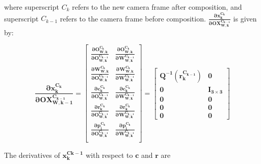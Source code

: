 \noindent where superscript $C_k$ refers to the new camera frame after
composition, and superscript $C_{k-1}$ refers to the camera frame
before composition.
$\boldsymbol{\frac{\partial x_k^{C_k}}{\partial OX_{W,k}^{C_{k-1}}}}$ is
given by:

\begin{equation}
\boldsymbol{\frac{\partial x_{k}^{C_k}}{\partial OX_{W,k-1}^{C_{k-1}}}}=
\begin{bmatrix}
\boldsymbol{\frac{\partial O_{W,k}^{C_k}}{\partial O_{W,k}^{C_{k-1}}}} & 
\boldsymbol{\frac{\partial O_{W,k}^{C_k}}{\partial W_{W,k}^{C_{k-1}}}} \\
\boldsymbol{\frac{\partial W_{W,k}^{C_k}}{\partial O_{W,k}^{C_{k-1}}}} & 
\boldsymbol{\frac{\partial W_{W,k}^{C_k}}{\partial W_{W,k}^{C_{k-1}}}} \\
\boldsymbol{\frac{\partial c_{k}^{C_k}}{\partial O_{W,k}^{C_{k-1}}}} &
\boldsymbol{\frac{\partial c_{k}^{C_k}}{\partial W_{W,k}^{C_{k-1}}}} \\
\boldsymbol{\frac{\partial r_{k}^{C_k}}{\partial O_{W,k}^{C_{k-1}}}} &
\boldsymbol{\frac{\partial r_{k}^{C_k}}{\partial W_{W,k}^{C_{k-1}}}} \\
\boldsymbol{\frac{\partial p_{i}^{C_k}}{\partial O_{W,k}^{C_{k-1}}}} & 
\boldsymbol{\frac{\partial p_{i}^{C_k}}{\partial W_{W,k}^{C_{k-1}}}} \\
\end{bmatrix}= \begin{bmatrix}
\boldsymbol{Q^{-1}(r_k^{C_{k-1}})} & \boldsymbol{0} \\
\boldsymbol{0} & \boldsymbol{I_{3\times 3}} \\
\boldsymbol{0} & \boldsymbol{0} \\
\boldsymbol{0} & \boldsymbol{0} \\
\boldsymbol{0} & \boldsymbol{0} 
\end{bmatrix}
\end{equation}


The derivatives of $\boldsymbol{x_{k}^{C{k-1}}}$ with respect to $\boldsymbol{c}$
and $\boldsymbol{r}$ are


